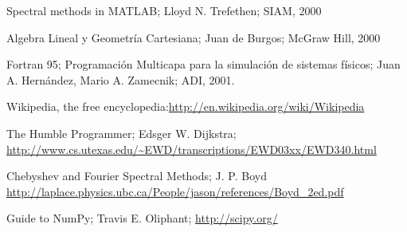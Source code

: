 \documentclass[10pt,fleqn,a4]{book}
\begin{document}
\begin{thebibliography}{99}

  Spectral methods in MATLAB; Lloyd N. Trefethen; SIAM, 2000


  Algebra Lineal y Geometría Cartesiana; Juan de Burgos; McGraw Hill,
  2000


  Fortran 95; Programación Multicapa para la simulación de sistemas
  físicos; Juan A. Hernández, Mario A. Zamecnik; ADI, 2001.


  Wikipedia, the free
  encyclopedia:\url{http://en.wikipedia.org/wiki/Wikipedia}


  The Humble Programmer; Edsger W. Dijkstra;
  \url{http://www.cs.utexas.edu/~EWD/transcriptions/EWD03xx/EWD340.html}

  Chebyshev and Fourier Spectral Methods; J. P. Boyd
  \url{http://laplace.physics.ubc.ca/People/jason/references/Boyd_2ed.pdf}

  Guide to NumPy; Travis E. Oliphant; \url{http://scipy.org/}

  



\end{thebibliography}





\printindex{}
\end{document}
